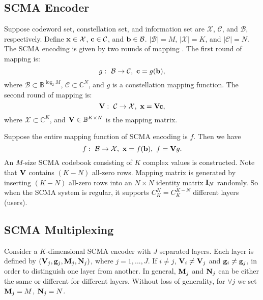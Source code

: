 \documentclass[journal,twoside]{IEEEtran}
\begin{document}
\subsection{SCMA Encoder}
Suppose codeword set, constellation set, and information set are $\mathcal{X}$, $\mathcal{C}$, and $\mathcal{B}$, respectively. Define ${\bf{x}} \in \mathcal{X}$, ${\bf{c}} \in \mathcal{C}$, and ${\bf{b}} \in \mathcal{B}$. $|\mathcal{B}|=M$, $|{\mathcal{X}}|=K$, and $|{\mathcal{C}}|=N$. The SCMA encoding is given by two rounds of mapping \cite{nikopour2013sparse}. The first round of mapping is:
\begin{equation}
g:~\mathcal{B} \rightarrow \mathcal{C},~{\bf{c}} = g ({\bf{b}}),
\end{equation}
where $\mathcal{B} \subset \mathbb{B}^{\log_{2}M}$, $\mathcal{C} \subset \mathbb{C}^{N}$, and $g$ is a constellation mapping function. The second round of mapping is:
\begin{equation}
{\bf{V}}:~\mathcal{C} \rightarrow \mathcal{X},~{\bf{x}} = {\bf{Vc}},
\end{equation}
where $\mathcal{X} \subset \mathbb{C}^{K}$, and ${\bf{V}} \in \mathbb{B}^{K \times N}$ is the mapping matrix.

Suppose the entire mapping function of SCMA encoding is $f$. Then we have
\begin{equation}
f:~\mathcal{B} \rightarrow \mathcal{X},~{\bf{x}} = f ({\bf{b}}),~f = {\bf{V}}g.
\end{equation}
An $M$-size SCMA codebook consisting of $K$ complex values is constructed.
Note that ${\bf{V}}$ contains $(K-N)$ all-zero rows. Mapping matrix is generated by inserting $(K-N)$ all-zero rows into an $N \times N$ identity matrix ${\bf{I}}_{N}$ randomly. So when the SCMA system is regular, it supports $C^{N}_{K} = C^{K-N}_{K}$ different layers (users).

\subsection{SCMA Multiplexing}
Consider a $K$-dimensional SCMA encoder with $J$ separated layers. Each layer is defined by $({\bf{V}}_j, {\bf{g}}_j, {\bf{M}}_j, {\bf{N}}_j)$, where $j = 1,...,J$. If $i \neq j$, ${\bf{V}}_i \neq {\bf{V}}_j$ and ${\bf{g}}_i \neq {\bf{g}}_j$, in order to distinguish one layer from another. In general, ${\bf{M}}_j$ and ${\bf{N}}_j$ can be either the same or different for different layers. Without loss of generality, for $\forall j$ we set ${\bf{M}}_j = M$, ${\bf{N}}_j = N$.
\end{document}
